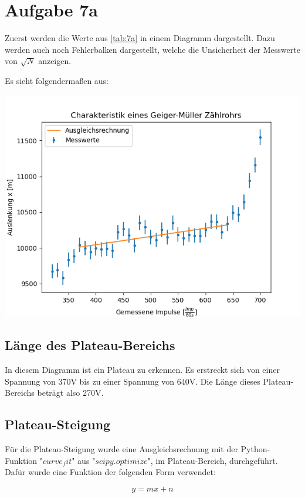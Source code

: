 \documentclass[captions=tableheading]{scrartcl}
\begin{document}
    
\section{Aufgabe 7a}

Zuerst werden die Werte aus \ref{tab:7a} in einem Diagramm dargestellt.
Dazu werden auch noch Fehlerbalken dargestellt,
welche die Unsicherheit der Messwerte von $\sqrt{N}$ anzeigen.

\noindent Es sieht folgendermaßen aus:

\includegraphics{7a.png}

\subsection{Länge des Plateau-Bereichs}

\noindent In diesem Diagramm ist ein Plateau zu erkennen.
Es erstreckt sich von einer Spannung von 370V bis zu einer Spannung von 640V.
Die Länge dieses Plateau-Bereichs beträgt also 270V.

\subsection{Plateau-Steigung}

Für die Plateau-Steigung wurde eine Ausgleichsrechnung mit der Python-Funktion "$curve_fit$" aus "$scipy.optimize$", im Plateau-Bereich, durchgeführt.
Dafür wurde eine Funktion der folgenden Form verwendet:

\begin{displaymath}
    y = mx + n
\end{displaymath}
\end{document}
